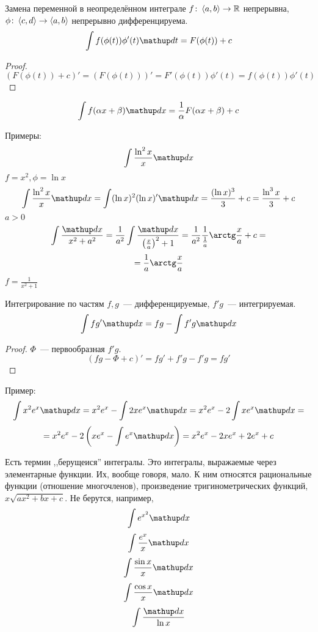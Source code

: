 \begin{theorem}{Замена переменной в неопределённом интеграле}
$f\colon \left<a, b\right> \rightarrow \mathbb{R}$ непрерывна, $\phi\colon \left<c, d\right> \rightarrow \left<a, b\right>$ непрерывно дифференцируема.
$$\int f(\phi(t)) \phi'(t) \d t = F(\phi(t)) + c$$
\end{theorem}
\begin{proof}
$$\left(F(\phi(t)) + c\right)' = (F(\phi(t)))' = F'(\phi(t)) \phi'(t) = f(\phi(t)) \phi'(t)$$
\end{proof}
\begin{conseq}
$$\int f(\alpha x + \beta) \d x = \frac1{\alpha}F(\alpha x + \beta) + c$$
\end{conseq}

Примеры:
$$\int \frac{\ln^2 x}{x}\d x$$
$f = x^2, \phi = \ln x$
$$\int \frac{\ln^2 x}{x} \d x = \int (\ln x)^2 (\ln x)' \d x = \frac{(\ln x)^3}3 + c = \frac{\ln^3 x}3 + c$$
$a>0$
$$\int \frac{\d x}{x^2 + a^2} = \frac1{a^2} \int \frac{\d x}{\left(\frac{x}a\right)^2 + 1} = \frac1{a^2} \frac1{\frac1a} \arctg \frac{x}a + c=$$
$$= \frac1a \arctg \frac{x}a$$
$f=\frac1{x^2+1}$

\begin{theorem}{Интегрирование по частям}
$f, g$~--- дифференцируемые, $f'g$~--- интегрируемая.
$$\int fg'\d x = fg - \int f'g \d x$$
\end{theorem}
\begin{proof}
$\Phi$~--- первообразная $f'g$.
$$(fg - \Phi + c)' = fg' + f'g - f'g = fg'$$
\end{proof}

Пример:
$$\int x^2 e^x \d x = x^2 e^x - \int 2x e^x \d x = x^2 e^x - 2 \int x e^x \d x = $$
$$ = x^2 e^x - 2\left(x e^x - \int e^x \d x\right) = x^2 e^x - 2x e^x + 2e^x + c$$

Есть термин ,,берущеися'' интегралы. Это интегралы, выражаемые через элементарные функции. Их, вообще говоря, мало. К ним относятся рациональные функции (отношение многочленов), произведение тригинометрических функций, $x\sqrt{ax^2 + bx + c}$. Не берутся, например, 
$$\int e^{x^2} \d x$$
$$\int \frac{e^x}x \d x$$
$$\int \frac{\sin x}x \d x$$
$$\int \frac{\cos x}x\d x$$
$$\int \frac{\d x}{\ln x}$$